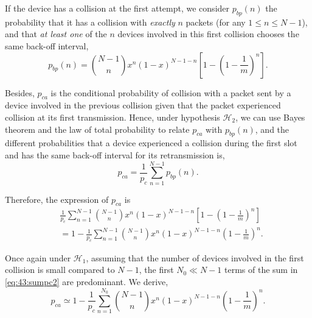 If the device has a collision at the first attempt, we consider $p_{bp}(n)$ the probability that it has a collision with \emph{exactly} $n$ packets (for any $1\leq n \leq N-1$), and that \emph{at least one} of the $n$ devices involved in this first collision chooses the same back-off interval,
%
\begin{equation}
    p_{bp}(n) = {N-1 \choose n} x^n \left(1-x\right)^{N-1-n}\left[1-\left( 1-\frac{1}{m}\right)^n \right].
\end{equation}


Besides, $p_{ca}$ is the conditional probability of collision with a packet sent by a device involved in the previous collision given that the packet experienced collision at its first transmission.
Hence, under hypothesis $\mathcal{H}_{2}$, we can use Bayes theorem and the law of total probability to relate $p_{ca}$ with $p_{bp}(n)$, and the different probabilities that a device experienced a collision during the first slot and has the same back-off interval for its retransmission is,
%
\begin{equation}\label{eq:43:sumpca}
	p_{ca} = \frac{1}{p_c}\sum_{n=1}^{N-1} p_{bp}(n).
\end{equation}


Therefore, the expression of $p_{ca}$ is
\begin{align}\label{eq:43:sumpc2}
	& \frac{1}{p_c} \sum_{n=1}^{N-1}{N-1 \choose n} x^n \left(1-x\right)^{N-1-n}\left[1-\left( 1-\frac{1}{m}\right)^n \right]\nonumber \\
	& = 1- \frac{1}{p_c}\sum_{n=1}^{N-1}{N-1 \choose n} x^n \left(1-x\right)^{N-1-n}\left( 1-\frac{1}{m}\right)^n.
\end{align}

Once again under $\mathcal{H}_{1}$, assuming that the number of devices involved in the first collision is small compared to $N-1$, the first $N_0 \ll N-1$ terms of the sum in \eqref{eq:43:sumpc2} are predominant. We derive,
%
\begin{equation}\label{eq:43:sumpca2}
	p_{ca} \simeq  1- \frac{1}{p_c}\sum_{n=1}^{N_0}{N-1 \choose n} x^n\left(1-x\right)^{N-1-n} \left( 1-\frac{1}{m}\right)^n.
\end{equation}



